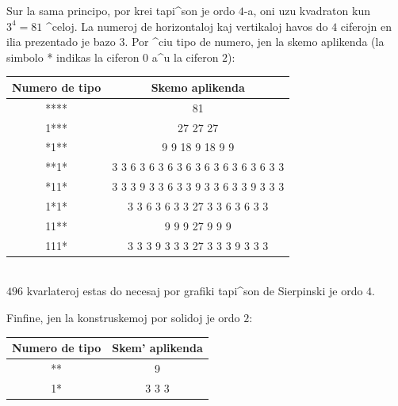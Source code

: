 Sur la sama principo, por krei tapi^son je ordo $4$-a, oni uzu
kvadraton kun $3^4=81$ ^celoj.  La numeroj de horizontaloj kaj
vertikaloj havos do $4$ ciferojn en ilia prezentado je bazo $3$.  Por
^ciu tipo de numero, jen la skemo aplikenda (la simbolo * indikas la
ciferon $0$ a^u la ciferon $2$):

\begin{center}
 \begin{tabular}{|c|c|}
 \hline
Numero de tipo & Skemo aplikenda \\
\hline
 **** & 81 \\ 
\hline
1*** &  27 27 27 \\
\hline
*1** & 9 9 18 9 18 9 9 \\
\hline
**1* & 3 3 6 3 6 3 6 3 6 3 6 3 6 3 6 3 6 3 3 \\
\hline
*11* &  3 3 3 9 3 3 6 3 3 9 3 3 6 3 3 9 3 3 3 \\
\hline
1*1* & 3 3 6 3 6 3 3 27 3 3 6 3 6 3 3 \\
\hline
11** & 9 9 9 27 9 9 9 \\
\hline
111*& 3 3 3 9 3 3 3 27 3 3 3 9 3 3 3 \\
\hline
\end{tabular}\\
$496$ kvarlateroj estas do necesaj por grafiki tapi^son de Sierpinski je ordo $4$.
\end{center}

Finfine, jen la konstruskemoj por solidoj je ordo $2$:
\begin{center}
  \begin{tabular}{|c|c|}
 \hline
Numero de tipo & Skem' aplikenda \\
\hline
** &  9 \\
\hline
1* & 3 3 3 \\ 
\hline
\end{tabular}
\end{center}

